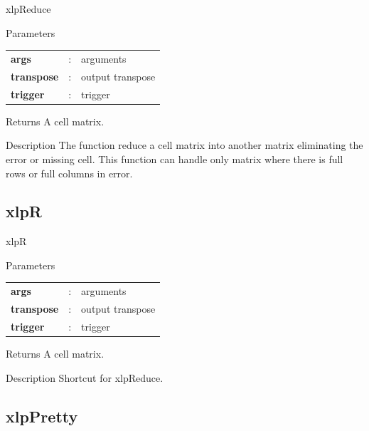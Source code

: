 \begin{xlpfunctitle}{xlpReduce}

\begin{xlpfunc}{Parameters}
\begin{tabular}{p{3.5cm}cl}
\textbf{args}& : & arguments \\
\textbf{transpose}& : & output transpose \\
\textbf{trigger}& : & trigger 
\end{tabular}
\end{xlpfunc}


\begin{xlpfunc}{Returns}
A cell matrix.
\end{xlpfunc}

\begin{xlpfunc}{Description}
The function reduce a cell matrix into another matrix eliminating the error or missing cell. This function can handle only matrix where there is full rows or full columns in error.
\end{xlpfunc}
\end{xlpfunctitle}


\subsection{xlpR}

\begin{xlpfunctitle}{xlpR}

\begin{xlpfunc}{Parameters}
\begin{tabular}{p{3.5cm}cl}
\textbf{args}& : & arguments \\
\textbf{transpose}& : & output transpose \\
\textbf{trigger}& : & trigger 
\end{tabular}
\end{xlpfunc}


\begin{xlpfunc}{Returns}
A cell matrix.
\end{xlpfunc}

\begin{xlpfunc}{Description}
Shortcut for xlpReduce.
\end{xlpfunc}
\end{xlpfunctitle}


\subsection{xlpPretty}

